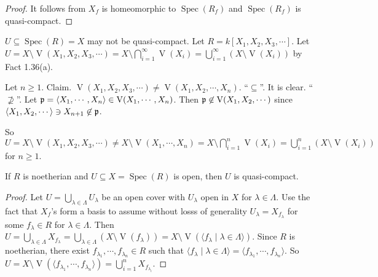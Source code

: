 \begin{proof}
    It follows from $X_f$ is homeomorphic to $\operatorname{Spec}(R_f)$ and $\operatorname{Spec}(R_f)$ is quasi-compact.
\end{proof}

\begin{example*}
    $U \subseteq \operatorname{Spec}(R) = X$ may not be quasi-compact. Let $R = k[X_1,X_2,X_3,\cdots]$. Let $U = X \setminus \operatorname{V}(X_1,X_2,X_3,\cdots) = X \setminus \bigcap_{i=1}^{\infty} \operatorname{V}(X_i) = \bigcup_{i=1}^\infty (X \setminus \operatorname{V}(X_i))$ by Fact 1.36(a). \par 
    Let $n \geq 1$. Claim. $\operatorname{V}(X_1,X_2,X_3,\cdots) \neq \operatorname{V}(X_1,X_2,\cdots,X_n)$. ``$\subseteq$''. It is clear. ``$\not \supseteq$''. Let $\mathfrak{p} = \langle X_1,\cdots,X_n \rangle \in \operatorname{V}(X_1,\cdots,X_n)$. Then $\mathfrak{p} \not \in \operatorname{V}(X_1,X_2,\cdots)$ since $\langle X_1,X_2,\cdots \rangle\ni X_{n+1} \not \in \mathfrak{p}$. \par 
    So $U = X \setminus \operatorname{V}(X_1,X_2,X_3,\cdots) \neq X \setminus \operatorname{V}(X_1,\cdots,X_n) = X \setminus \bigcap_{i=1}^{n} \operatorname{V}(X_i) = \bigcup_{i=1}^n (X \setminus \operatorname{V}(X_i))$ for $n \geq 1$. 
\end{example*}

\begin{fact*}
    If $R$ is noetherian and $U \subseteq X = \operatorname{Spec}(R)$ is open, then $U$ is quasi-compact. 
\end{fact*}

\begin{proof}
    Let $U = \bigcup_{\lambda \in \Lambda}U_\lambda$ be an open cover with $U_\lambda$ open in $X$ for $\lambda \in \Lambda$. Use the fact that $X_f$'s form a basis to assume without losss of generality $U_\lambda = X_{f_\lambda}$ for some $f_\lambda \in R$ for $\lambda \in \Lambda$. Then $U = \bigcup_{\lambda \in \Lambda} X_{f_\lambda} = \bigcup_{\lambda \in \Lambda} (X \setminus \operatorname{V}(f_\lambda)) = X \setminus \operatorname{V}(\langle f_\lambda \mid \lambda \in \Lambda \rangle)$. Since $R$ is noetherian, there exist $f_{\lambda_1},\cdots,f_{\lambda_n} \in R$ such that $\langle f_\lambda \mid \lambda \in \Lambda \rangle = \langle f_{\lambda_1},\cdots,f_{\lambda_n} \rangle$. So $U = X \setminus \operatorname{V}(\langle f_{\lambda_1},\cdots,f_{\lambda_n} \rangle) = \bigcup_{i=1}^n X_{f_{\lambda_i}}$. 
\end{proof}

